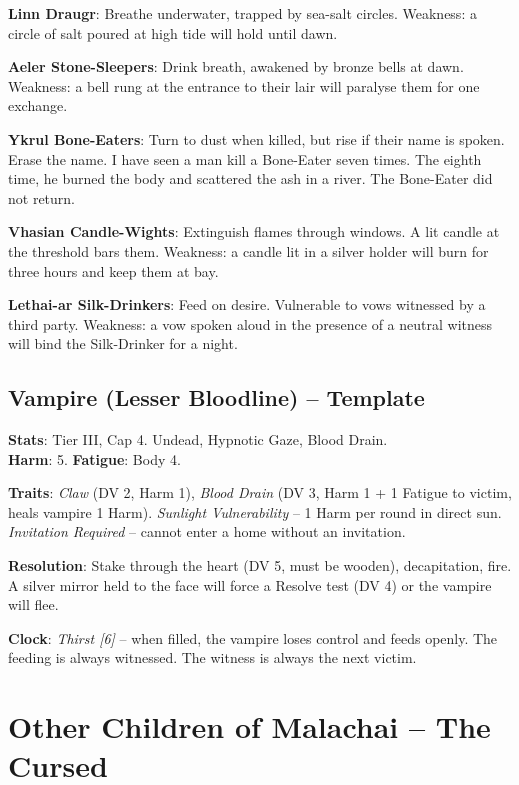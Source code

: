 \noindent\textbf{Linn Draugr}: Breathe underwater, trapped by sea-salt circles. Weakness: a circle of salt poured at high tide will hold until dawn.

\noindent\textbf{Aeler Stone-Sleepers}: Drink breath, awakened by bronze bells at dawn. Weakness: a bell rung at the entrance to their lair will paralyse them for one exchange.

\noindent\textbf{Ykrul Bone-Eaters}: Turn to dust when killed, but rise if their name is spoken. Erase the name. I have seen a man kill a Bone-Eater seven times. The eighth time, he burned the body and scattered the ash in a river. The Bone-Eater did not return.

\noindent\textbf{Vhasian Candle-Wights}: Extinguish flames through windows. A lit candle at the threshold bars them. Weakness: a candle lit in a silver holder will burn for three hours and keep them at bay.

\noindent\textbf{Lethai-ar Silk-Drinkers}: Feed on desire. Vulnerable to vows witnessed by a third party. Weakness: a vow spoken aloud in the presence of a neutral witness will bind the Silk-Drinker for a night.

\subsection*{Vampire (Lesser Bloodline) -- Template}

\noindent\textbf{Stats}: Tier III, Cap 4. Undead, Hypnotic Gaze, Blood Drain.\\
\textbf{Harm}: 5. \textbf{Fatigue}: Body 4.

\noindent\textbf{Traits}: 
\emph{Claw} (DV 2, Harm 1), \emph{Blood Drain} (DV 3, Harm 1 + 1 Fatigue to victim, heals vampire 1 Harm). \emph{Sunlight Vulnerability} -- 1 Harm per round in direct sun. \emph{Invitation Required} -- cannot enter a home without an invitation.

\noindent\textbf{Resolution}: Stake through the heart (DV 5, must be wooden), decapitation, fire. A silver mirror held to the face will force a Resolve test (DV 4) or the vampire will flee.

\noindent\textbf{Clock}: \emph{Thirst [6]} -- when filled, the vampire loses control and feeds openly. The feeding is always witnessed. The witness is always the next victim.


\section*{Other Children of Malachai -- The Cursed}

